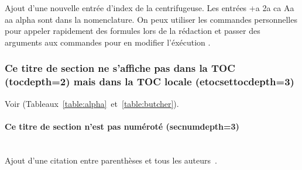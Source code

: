 		Ajout d'une nouvelle entrée d'index de la centrifugeuse. Les entrées \gls{+a} \gls{2a} \gls{ca} \gls{Aa} \gls{aa} \gls{alpha} {\NoAutoSpaceBeforeFDP}sont dans la nomenclature. On peux utiliser les commandes personnelles pour appeler rapidement des formules lors de la rédaction \acc et passer des arguments aux commandes pour en modifier l'éxécution \emiss[\nu]{\Omega}.


		\subsubsection{Ce titre de section ne s'affiche pas dans la TOC (tocdepth=2) mais dans la TOC locale (etocsettocdepth=3)}

			Voir (Tableaux~\ref{table:alpha}~et~\ref{table:butcher}).

			\paragraph{Ce titre de section n'est pas numéroté (secnumdepth=3)}~~\\ %

				Ajout d'une citation entre parenthèses et tous les auteurs~\parencite{zohdy_mapping_2012}.
